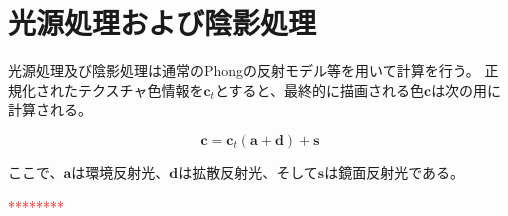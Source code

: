 \section{光源処理および陰影処理}
\label{SPhongandshade}

光源処理及び陰影処理は通常のPhongの反射モデル等を用いて計算を行う。
正規化されたテクスチャ色情報を$\bm{c}_t$とすると、最終的に描画される色$\bm{c}$は次の用に計算される。

\begin{equation}
\label{EColor}
\bm{c} = \bm{c}_t(\bm{a} + \bm{d}) + \bm{s}
\end{equation}

\noindent
ここで、$\bm{a}$は環境反射光、$\bm{d}$は拡散反射光、そして$\bm{s}$は鏡面反射光である。


\textcolor{red}{********}
